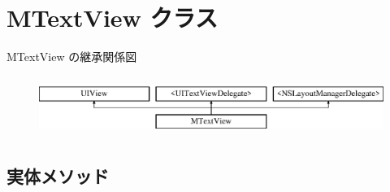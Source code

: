 \hypertarget{interface_m_text_view}{}\section{M\+Text\+View クラス}
\label{interface_m_text_view}
M\+Text\+View の継承関係図\begin{figure}[H]
\begin{center}
\leavevmode
\includegraphics[height=1.964912cm]{interface_m_text_view}
\end{center}
\end{figure}
\subsection*{実体メソッド}
